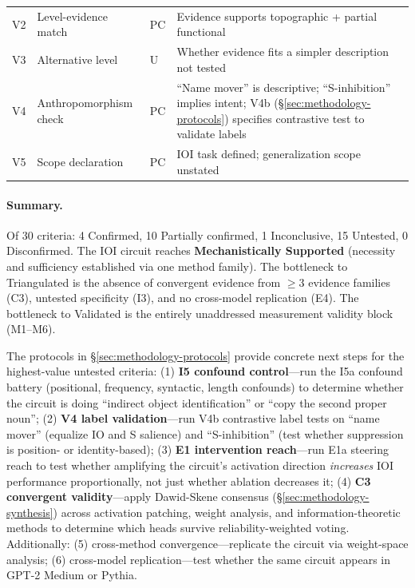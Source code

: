 \documentclass{article}
\begin{document}
\begin{table}[H]
\begin{tabular}{@{}llll>{\raggedright\arraybackslash}p{6.5cm}@{}}
V2 & Level-evidence match & PC & Evidence supports topographic + partial functional \\
V3 & Alternative level & U & Whether evidence fits a simpler description not tested \\
V4 & Anthropomorphism check & PC & ``Name mover'' is descriptive; ``S-inhibition'' implies intent; V4b (\S\ref{sec:methodology-protocols}) specifies contrastive test to validate labels \\
V5 & Scope declaration & PC & IOI task defined; generalization scope unstated \\
\bottomrule
\end{tabular}
\end{table}

\paragraph{Summary.} Of 30 criteria: 4 Confirmed, 10 Partially confirmed, 1 Inconclusive, 15 Untested, 0 Disconfirmed. The IOI circuit reaches \textbf{Mechanistically Supported} (necessity and sufficiency established via one method family). The bottleneck to Triangulated is the absence of convergent evidence from $\geq 3$ evidence families (C3), untested specificity (I3), and no cross-model replication (E4). The bottleneck to Validated is the entirely unaddressed measurement validity block (M1--M6).

The protocols in \S\ref{sec:methodology-protocols} provide concrete next steps for the highest-value untested criteria: (1) \textbf{I5 confound control}---run the I5a confound battery (positional, frequency, syntactic, length confounds) to determine whether the circuit is doing ``indirect object identification'' or ``copy the second proper noun''; (2) \textbf{V4 label validation}---run V4b contrastive label tests on ``name mover'' (equalize IO and S salience) and ``S-inhibition'' (test whether suppression is position- or identity-based); (3) \textbf{E1 intervention reach}---run E1a steering reach to test whether amplifying the circuit's activation direction \emph{increases} IOI performance proportionally, not just whether ablation decreases it; (4) \textbf{C3 convergent validity}---apply Dawid-Skene consensus (\S\ref{sec:methodology-synthesis}) across activation patching, weight analysis, and information-theoretic methods to determine which heads survive reliability-weighted voting. Additionally: (5) cross-method convergence---replicate the circuit via weight-space analysis; (6) cross-model replication---test whether the same circuit appears in GPT-2 Medium or Pythia.
\end{document}
